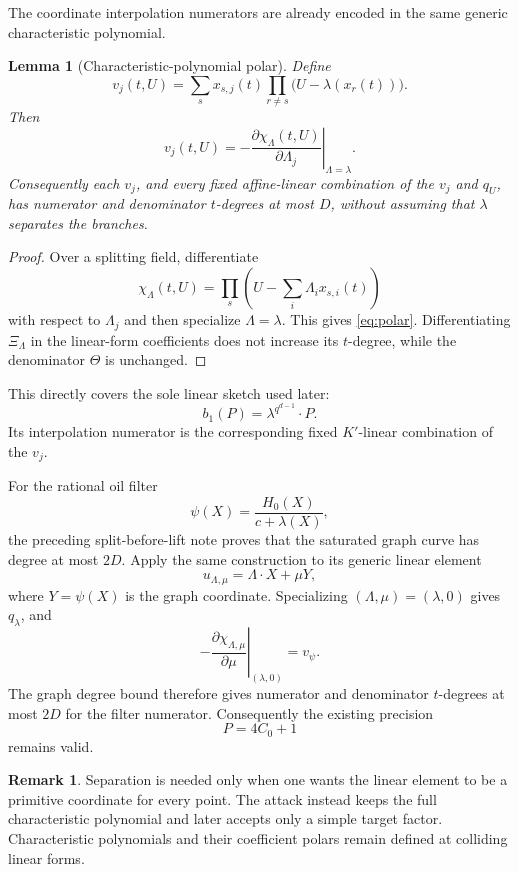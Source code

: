 \documentclass[11pt]{article}
\newtheorem{lemma}[theorem]{Lemma}
\theoremstyle{definition}
\newtheorem{remark}[theorem]{Remark}
\begin{document}
The coordinate interpolation numerators are already encoded in the same generic characteristic polynomial.

\begin{lemma}[Characteristic-polynomial polar]\label{lem:polar}
Define
\[
 v_j(t,U)=\sum_s x_{s,j}(t)
       \prod_{r\ne s}\bigl(U-\lambda(x_r(t))\bigr).
\]
Then
\begin{equation}\label{eq:polar}
 v_j(t,U)
 =-\left.\frac{\partial\chi_\Lambda(t,U)}{\partial\Lambda_j}
   \right|_{\Lambda=\lambda}.
\end{equation}
Consequently each $v_j$, and every fixed affine-linear combination of the $v_j$ and $q_U$, has numerator and denominator $t$-degrees at most $D$, without assuming that $\lambda$ separates the branches.
\end{lemma}

\begin{proof}
Over a splitting field, differentiate
\[
 \chi_\Lambda(t,U)=\prod_s\left(U-\sum_i\Lambda_i x_{s,i}(t)\right)
\]
with respect to $\Lambda_j$ and then specialize $\Lambda=\lambda$.  This gives \eqref{eq:polar}.  Differentiating $\Xi_\Lambda$ in the linear-form coefficients does not increase its $t$-degree, while the denominator $\Theta$ is unchanged.
\end{proof}

This directly covers the sole linear sketch used later:
\[
 b_1(P)=\lambda^{q^{d-1}}\!\cdot P.
\]
Its interpolation numerator is the corresponding fixed $K'$-linear combination of the $v_j$.

For the rational oil filter
\[
 \psi(X)=\frac{H_0(X)}{c+\lambda(X)},
\]
the preceding split-before-lift note proves that the saturated graph curve has degree at most $2D$.  Apply the same construction to its generic linear element
\[
 u_{\Lambda,\mu}=\Lambda\cdot X+\mu Y,
\]
where $Y=\psi(X)$ is the graph coordinate.  Specializing $(\Lambda,\mu)=(\lambda,0)$ gives $q_\lambda$, and
\[
 -\left.\frac{\partial\chi_{\Lambda,\mu}}{\partial\mu}
 \right|_{(\lambda,0)}
 =v_\psi.
\]
The graph degree bound therefore gives numerator and denominator $t$-degrees at most $2D$ for the filter numerator.  Consequently the existing precision
\[
 P=4C_0+1
\]
remains valid.

\begin{remark}
Separation is needed only when one wants the linear element to be a primitive coordinate for every point.  The attack instead keeps the full characteristic polynomial and later accepts only a simple target factor.  Characteristic polynomials and their coefficient polars remain defined at colliding linear forms.
\end{remark}
\end{document}
